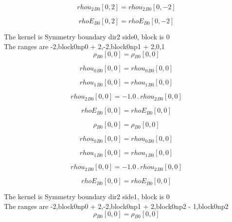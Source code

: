 \documentclass{article}
\begin{document}
\begin{dmath}{rhou_{2}{_{B0}}}[{0,2}] = {rhou_{2}{_{B0}}}[{0,-2}]\end{dmath}

\begin{dmath}{rhoE{_{B0}}}[{0,2}] = {rhoE{_{B0}}}[{0,-2}]\end{dmath}

\noindent The kernel is Symmetry boundary dir2 side0, block is 0\\\noindent The ranges are -2,block0np0 + 2,-2,block0np1 + 2,0,1\\\begin{dmath}{\rho{_{B0}}}[{0,0}] = {\rho{_{B0}}}[{0,0}]\end{dmath}

\begin{dmath}{rhou_{0}{_{B0}}}[{0,0}] = {rhou_{0}{_{B0}}}[{0,0}]\end{dmath}

\begin{dmath}{rhou_{1}{_{B0}}}[{0,0}] = {rhou_{1}{_{B0}}}[{0,0}]\end{dmath}

\begin{dmath}{rhou_{2}{_{B0}}}[{0,0}] = - 1.0 \,.\, {rhou_{2}{_{B0}}}[{0,0}]\end{dmath}

\begin{dmath}{rhoE{_{B0}}}[{0,0}] = {rhoE{_{B0}}}[{0,0}]\end{dmath}

\begin{dmath}{\rho{_{B0}}}[{0,0}] = {\rho{_{B0}}}[{0,0}]\end{dmath}

\begin{dmath}{rhou_{0}{_{B0}}}[{0,0}] = {rhou_{0}{_{B0}}}[{0,0}]\end{dmath}

\begin{dmath}{rhou_{1}{_{B0}}}[{0,0}] = {rhou_{1}{_{B0}}}[{0,0}]\end{dmath}

\begin{dmath}{rhou_{2}{_{B0}}}[{0,0}] = - 1.0 \,.\, {rhou_{2}{_{B0}}}[{0,0}]\end{dmath}

\begin{dmath}{rhoE{_{B0}}}[{0,0}] = {rhoE{_{B0}}}[{0,0}]\end{dmath}

\noindent The kernel is Symmetry boundary dir2 side1, block is 0\\\noindent The ranges are -2,block0np0 + 2,-2,block0np1 + 2,block0np2 - 1,block0np2\\\begin{dmath}{\rho{_{B0}}}[{0,0}] = {\rho{_{B0}}}[{0,0}]\end{dmath}
\end{document}
